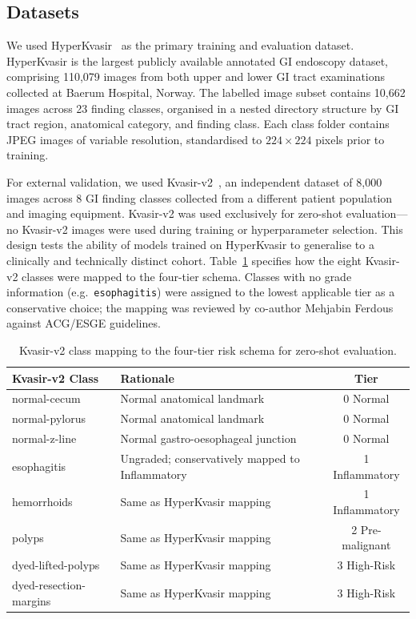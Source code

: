 \documentclass[11pt,a4paper]{article}
\begin{document}
\subsection{Datasets}
\label{sec:datasets}

We used HyperKvasir~\citep{Borgli2020} as the primary training and evaluation
dataset. HyperKvasir is the largest publicly available annotated GI endoscopy
dataset, comprising 110,079 images from both upper and lower GI tract
examinations collected at Baerum Hospital, Norway. The labelled image subset
contains 10,662 images across 23 finding classes, organised in a nested
directory structure by GI tract region, anatomical category, and finding
class. Each class folder contains JPEG images of variable resolution,
standardised to $224\times224$ pixels prior to training.

For external validation, we used Kvasir-v2~\citep{Pogorelov2017b}, an
independent dataset of 8,000 images across 8 GI finding classes collected
from a different patient population and imaging equipment. Kvasir-v2 was used
exclusively for zero-shot evaluation---no Kvasir-v2 images were used during
training or hyperparameter selection. This design tests the ability of models
trained on HyperKvasir to generalise to a clinically and technically distinct
cohort. Table~\ref{tab:kv2_mapping} specifies how the eight Kvasir-v2 classes
were mapped to the four-tier schema. Classes with no grade information
(e.g.\ \texttt{esophagitis}) were assigned to the lowest applicable tier as a
conservative choice; the mapping was reviewed by co-author Mehjabin Ferdous
against ACG/ESGE guidelines.

\begin{table}[H]
\centering
\caption{Kvasir-v2 class mapping to the four-tier risk schema for zero-shot evaluation.}
\label{tab:kv2_mapping}
\begin{tabular}{llc}
\toprule
\textbf{Kvasir-v2 Class} & \textbf{Rationale} & \textbf{Tier}\\
\midrule
normal-cecum & Normal anatomical landmark & 0 Normal\\
normal-pylorus & Normal anatomical landmark & 0 Normal\\
normal-z-line & Normal gastro-oesophageal junction & 0 Normal\\
esophagitis & Ungraded; conservatively mapped to Inflammatory & 1 Inflammatory\\
hemorrhoids & Same as HyperKvasir mapping & 1 Inflammatory\\
polyps & Same as HyperKvasir mapping & 2 Pre-malignant\\
dyed-lifted-polyps & Same as HyperKvasir mapping & 3 High-Risk\\
dyed-resection-margins & Same as HyperKvasir mapping & 3 High-Risk\\
\bottomrule
\end{tabular}
\end{table}
\end{document}
